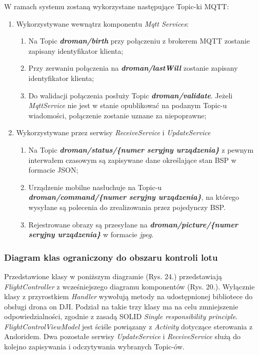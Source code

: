   W ramach systemu zostaną wykorzystane następujące Topic-ki MQTT:
  \begin{enumerate}
  \item Wykorzystywane wewnątrz komponentu \textit{Mqtt Services}:\begin{enumerate}
  \item Na Topic \textit{\textbf{droman/birth}} przy połączeniu z brokerem MQTT zostanie zapisany identyfikator klienta;
  \item Przy zerwaniu połączenia na \textit{\textbf{droman/lastWill}} zostanie zapisany identyfikator klienta;
  \item Do walidacji połączenia posłuży Topic \textit{\textbf{droman/validate}}. Jeżeli \textit{MqttService} nie jest w stanie opublikować na podanym Topic-u wiadomości, połączenie zostanie uznane za niepoprawne;\end{enumerate}
  \item Wykorzystywane przez serwisy \textit{ReceiveService} i \textit{UpdateService}\begin{enumerate}
  \item Na Topic \textit{\textbf{droman/status/\{numer seryjny urządzenia\}}} z pewnym interwałem czasowym są zapisywane dane określające stan BSP w formacie JSON;
  \item Urządzenie mobilne nasłuchuje na Topic-u\\ \textit{\textbf{droman/command/\{numer seryjny urządzenia\}}}, na którego wysyłane są polecenia do zrealizowania przez pojedynczy BSP.
  \item Rejestrowane obrazy są przesyłane na \textit{\textbf{droman/picture/\{numer seryjny urządzenia\}}} w formacie \textit{jpeg}.
  \end{enumerate}
\end{enumerate}
\newpage

\subsubsection{Diagram klas ograniczony do obszaru kontroli lotu}
  
Przedstawione klasy w poniższym diagramie (Rys. 24.) przedstawiają \textit{FlightController} z wcześniejszego diagramu komponentów (Rys. 20.). Wyłącznie klasy z przyrostkiem \textit{Handler} wywołują metody na udostępnionej bibliotece do obsługi drona on DJI. Podział na takie trzy klasy ma na celu zmniejszenie odpowiedzialności, zgodnie z zasadą SOLID \textit{Single responsibility principle}. \textit{FlightControlViewModel} jest ściśle powiązany z \textit{Activity} dotyczące sterowania z Andoridem. Dwa pozostałe serwisy \textit{UpdateService} i \textit{ReceiveService} służą do kolejno zapisywania i odczytywania wybranych Topic-ów.

